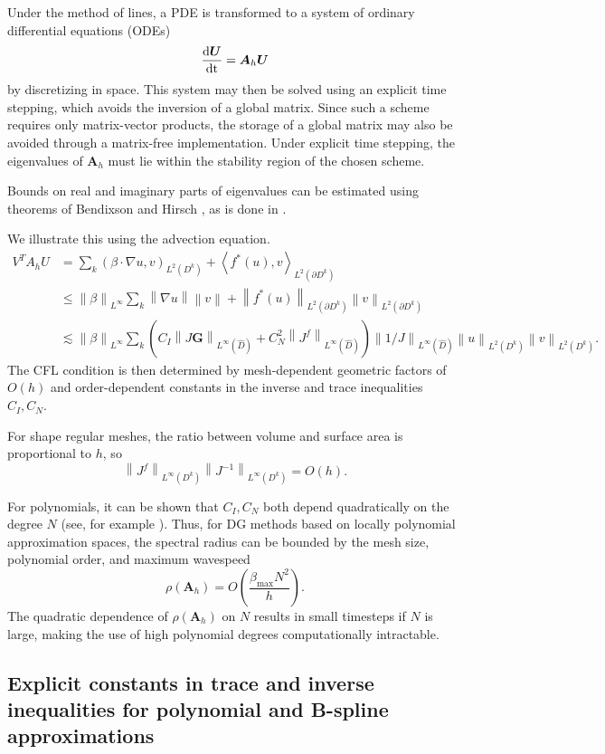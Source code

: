 \documentclass{siamart0216}
\newcommand{\td}[2]{\frac{{\rm d}#1}{{\rm d}{\rm #2}}}
\newcommand{\nor}[1]{\left\| #1 \right\|}
\newcommand{\LRp}[1]{\left( #1 \right)}
\newcommand{\LRa}[1]{\left\langle #1 \right\rangle}
\newcommand{\Grad} {\ensuremath{\nabla}}
\newcommand{\Lk}{L^2\LRp{D^k}}
\newcommand{\Ldk}{L^2\LRp{\partial D^k}}
\newcommand{\Dhat}{\widehat{D}}
\newcommand{\LinfDk}{L^{\infty}\LRp{D^k}}
\begin{document}
Under the method of lines, a PDE is transformed to a system of ordinary differential equations (ODEs) 
\[
\td{\bm{U}}{t} = \bm{A}_h \bm{U}
\]
by discretizing in space.  This system may then be solved using an explicit time stepping, which avoids the inversion of a global matrix.  Since such a scheme requires only matrix-vector products, the storage of a global matrix may also be avoided through a matrix-free implementation.  Under explicit time stepping, the eigenvalues of $\bm{A}_h$ must lie within the stability region of the chosen scheme.  

Bounds on real and imaginary parts of eigenvalues can be estimated using theorems of Bendixson and Hirsch \cite{marcus1992survey}, as is done in \cite{chan2015gpu}.  

We illustrate this using the advection equation.  
\begin{align*}
V^T A_h U &= \sum_{k} \LRp{\beta\cdot\Grad u,v}_{\Lk} + \LRa{f^*(u),v}_{\Ldk} \\
&\leq \nor{\beta}_{L^\infty}\sum_{k} \nor{\Grad u}\nor{v} + \nor{f^*(u)}_{\Ldk}\nor{v}_{\Ldk}\\
&\lesssim \nor{\beta}_{L^\infty}\sum_{k} \LRp{C_I \nor{J\bm{G}}_{L^\infty\LRp{\Dhat}}  + C_N^2 \nor{J^f}_{L^\infty\LRp{\Dhat}}}\nor{1/J}_{L^\infty\LRp{\Dhat}}\nor{u}_{\Lk}\nor{v}_{\Lk}.  
\end{align*}
The CFL condition is then determined by mesh-dependent geometric factors of $O(h)$ and order-dependent constants in the inverse and trace inequalities $C_I, C_N$.  

For shape regular meshes, the ratio between volume and surface area is proportional to $h$, so 
\[
\nor{J^f}_{\LinfDk} \nor{J^{-1}}_{\LinfDk} = O(h).
\]

For polynomials, it can be shown that $C_I,C_N$ both depend quadratically on the degree $N$ (see, for example \cite{warburton2003constants, ozisik2010constants}).  Thus, for DG methods based on locally polynomial approximation spaces, the spectral radius can be bounded by the mesh size, polynomial order, and maximum wavespeed
\[
\rho\LRp{\bm{A}_h} = O\LRp{\frac{\beta_{\max} N^2}{h}}.  
\]
The quadratic dependence of $\rho\LRp{\bm{A}_h}$ on $N$ results in small timesteps if $N$ is large, making the use of high polynomial degrees computationally intractable.  

\subsection{Explicit constants in trace and inverse inequalities for polynomial and B-spline approximations}
\end{document}
